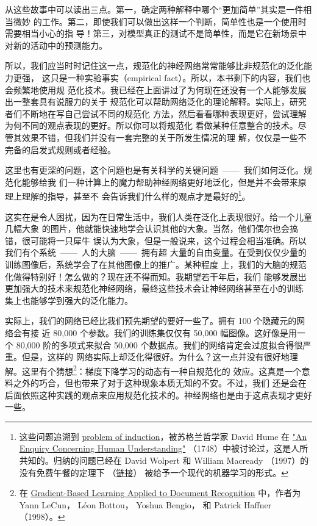 从这些故事中可以读出三点。第一，确定两种解释中哪个“更加简单”其实是一件相当微妙
的工作。第二，即使我们可以做出这样一个判断，简单性也是一个使用时需要相当小心的指
导！第三，对模型真正的测试不是简单性，而是它在新场景中对新的活动中的预测能力。

所以，我们应当时时记住这一点，规范化的神经网络常常能够比非规范化的泛化能力更强，
这只是一种实验事实（empirical fact）。所以，本书剩下的内容，我们也会频繁地使用规
范化技术。我已经在上面讲过了为何现在还没有一个人能够发展出一整套具有说服力的关于
规范化可以帮助网络泛化的理论解释。实际上，研究者们不断地在写自己尝试不同的规范化
方法，然后看看哪种表现更好，尝试理解为何不同的观点表现的更好。所以你可以将规范化
看做某种任意整合的技术。尽管其效果不错，但我们并没有一套完整的关于所发生情况的理
解，仅仅是一些不完备的启发式规则或者经验。

这里也有更深的问题，这个问题也是有关科学的关键问题~——~我们如何泛化。规范化能够给我
们一种计算上的魔力帮助神经网络更好地泛化，但是并不会带来原理上理解的指导，甚至不
会告诉我们什么样的观点才是最好的\footnote{这些问题追溯到
  \href{http://en.wikipedia.org/wiki/Problem_of_induction}{problem of
    induction}，被苏格兰哲学家 David Hume 在
  \href{http://www.gutenberg.org/ebooks/9662}{"An Enquiry Concerning Human
    Understanding"} （1748）中被讨论过，这是人所共知的。归纳的问题已经在 David Wolpert 
		和 William Macready （1997）的没有免费午餐的定理下%
		（\href{http://ieeexplore.ieee.org/xpl/articleDetails.jsp?tp=&arnumber=585893}{链接}）%
		被给予一个现代的机器学习的形式。}。

这实在是令人困扰，因为在日常生活中，我们人类在泛化上表现很好。给一个儿童几幅大象
的图片，他就能快速地学会认识其他的大象。当然，他们偶尔也会搞错，很可能将一只犀牛
误认为大象，但是一般说来，这个过程会相当准确。所以我们有个系统~——~人的大脑~——~拥有超
大量的自由变量。在受到仅仅少量的训练图像后，系统学会了在其他图像上的推广。某种程度
上，我们的大脑的规范化做得特别好！怎么做的？现在还不得而知。我期望若干年后，我们
能够发展出更加强大的技术来规范化神经网络，最终这些技术会让神经网络甚至在小的训练
集上也能够学到强大的泛化能力。

实际上，我们的网络已经比我们预先期望的要好一些了。拥有 100 个隐藏元的网络会有接
近 80,000 个参数。我们的训练集仅仅有 50,000 幅图像。这好像是用一个 80,000
阶的多项式来拟合 50,000 个数据点。我们的网络肯定会过度拟合得很严重。但是，这样的
网络实际上却泛化得很好。为什么？这一点并没有很好地理解。这里有个猜想\footnote{在
  \href{http://yann.lecun.com/exdb/publis/pdf/lecun-01a.pdf}{Gradient-Based
    Learning Applied to Document Recognition} 中，作者为 Yann LeCun， Léon Bottou，
  Yoshua Bengio， 和 Patrick Haffner （1998）。}：梯度下降学习的动态有一种自规范化的
效应。这真是一个意料之外的巧合，但也带来了对于这种现象本质无知的不安。不过，我们
还是会在后面依照这种实践的观点来应用规范化技术的。神经网络也是由于这点表现才更好
一些。

